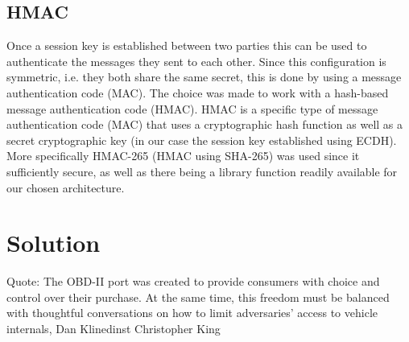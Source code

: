 \documentclass[11pt]{article}
\begin{document}
\subsection{HMAC} Once a session key is established between two parties this can be used to authenticate the messages they sent to each other. Since this configuration is symmetric, i.e. they both share the same secret, this is done by using a message authentication code (MAC). The choice was made to work with a hash-based message authentication code (HMAC). HMAC is a specific type of message authentication code (MAC) that uses a cryptographic hash function as well as a secret cryptographic key (in our case the session key established using ECDH). More specifically HMAC-265 (HMAC using SHA-265) was used since it sufficiently secure, as well as there being a library function readily available for our chosen architecture.





\section{Solution}
Quote: The OBD-II port was created to provide consumers with choice and control over their purchase. At the same time, this freedom must be balanced with thoughtful conversations on how to limit adversaries’ access to vehicle internals, Dan Klinedinst Christopher King
\end{document}
